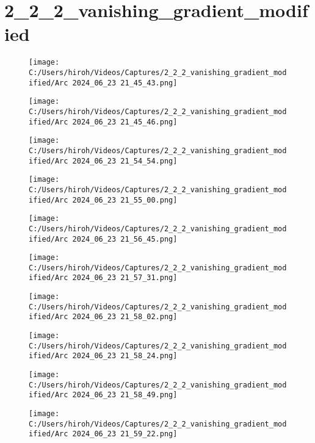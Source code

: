 \documentclass{ltjsarticle}
\begin{document}
\section{2\_2\_2\_vanishing\_gradient\_modified}
\begin{figure}[htbp]
  \centering
  \texttt{[image: C:/Users/hiroh/Videos/Captures/2\_2\_2\_vanishing\_gradient\_modified/Arc 2024\_06\_23 21\_45\_43.png]}
\end{figure}
\begin{figure}[htbp]
  \centering
  \texttt{[image: C:/Users/hiroh/Videos/Captures/2\_2\_2\_vanishing\_gradient\_modified/Arc 2024\_06\_23 21\_45\_46.png]}
\end{figure}
\begin{figure}[htbp]
  \centering
  \texttt{[image: C:/Users/hiroh/Videos/Captures/2\_2\_2\_vanishing\_gradient\_modified/Arc 2024\_06\_23 21\_54\_54.png]}
\end{figure}
\begin{figure}[htbp]
  \centering
  \texttt{[image: C:/Users/hiroh/Videos/Captures/2\_2\_2\_vanishing\_gradient\_modified/Arc 2024\_06\_23 21\_55\_00.png]}
\end{figure}
\begin{figure}[htbp]
  \centering
  \texttt{[image: C:/Users/hiroh/Videos/Captures/2\_2\_2\_vanishing\_gradient\_modified/Arc 2024\_06\_23 21\_56\_45.png]}
\end{figure}
\begin{figure}[htbp]
  \centering
  \texttt{[image: C:/Users/hiroh/Videos/Captures/2\_2\_2\_vanishing\_gradient\_modified/Arc 2024\_06\_23 21\_57\_31.png]}
\end{figure}
\begin{figure}[htbp]
  \centering
  \texttt{[image: C:/Users/hiroh/Videos/Captures/2\_2\_2\_vanishing\_gradient\_modified/Arc 2024\_06\_23 21\_58\_02.png]}
\end{figure}
\begin{figure}[htbp]
  \centering
  \texttt{[image: C:/Users/hiroh/Videos/Captures/2\_2\_2\_vanishing\_gradient\_modified/Arc 2024\_06\_23 21\_58\_24.png]}
\end{figure}
\begin{figure}[htbp]
  \centering
  \texttt{[image: C:/Users/hiroh/Videos/Captures/2\_2\_2\_vanishing\_gradient\_modified/Arc 2024\_06\_23 21\_58\_49.png]}
\end{figure}
\begin{figure}[htbp]
  \centering
  \texttt{[image: C:/Users/hiroh/Videos/Captures/2\_2\_2\_vanishing\_gradient\_modified/Arc 2024\_06\_23 21\_59\_22.png]}
\end{figure}
\end{document}
